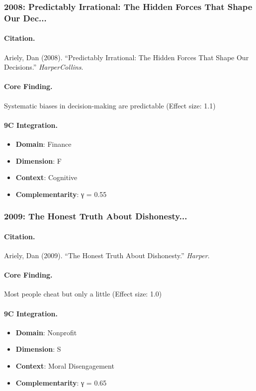 \subsubsection{2008: Predictably Irrational: The Hidden Forces That Shape Our Dec...}

\paragraph{Citation.}
Ariely, Dan (2008). ``Predictably Irrational: The Hidden Forces That Shape Our Decisions.''
\textit{HarperCollins}.

\paragraph{Core Finding.}
Systematic biases in decision-making are predictable (Effect size: 1.1)

\paragraph{9C Integration.}
\begin{itemize}[nosep]
  \item \textbf{Domain}: Finance
  \item \textbf{Dimension}: F
  \item \textbf{Context}: Cognitive
  \item \textbf{Complementarity}: γ = 0.55
\end{itemize}

\subsubsection{2009: The Honest Truth About Dishonesty...}

\paragraph{Citation.}
Ariely, Dan (2009). ``The Honest Truth About Dishonesty.''
\textit{Harper}.

\paragraph{Core Finding.}
Most people cheat but only a little (Effect size: 1.0)

\paragraph{9C Integration.}
\begin{itemize}[nosep]
  \item \textbf{Domain}: Nonprofit
  \item \textbf{Dimension}: S
  \item \textbf{Context}: Moral Disengagement
  \item \textbf{Complementarity}: γ = 0.65
\end{itemize}

